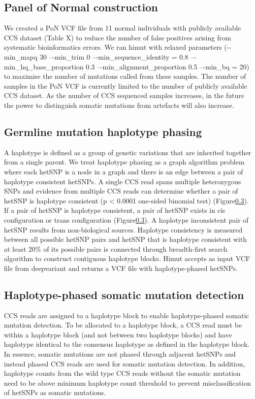 \subsection{Panel of Normal construction}

We created a PoN VCF file from 11 normal individuals with publicly available CCS dataset (Table X) to reduce the number of false positives arising from systematic bioinformatics errors. We ran himut with relaxed parameters (-{}-min\_mapq 30 –{}-min\_trim 0 –{}-min\_sequence\_identity = 0.8 –{}-min\_hq\_base\_proportion 0.3 –{}-min\_alignment\_proportion 0.5 –{}-min\_bq = 20) to maximise the number of mutations called from these samples. The number of samples in the PoN VCF is currently limited to the number of publicly available CCS dataset. As the number of CCS sequenced samples increases, in the future the power to distinguish somatic mutations from artefacts will also increase.  

\subsection{Germline mutation haplotype phasing}

A haplotype is defined as a group of genetic variations that are inherited together from a single parent. We treat haplotype phasing as a graph algorithm problem where each hetSNP is a node in a graph and there is an edge between a pair of haplotype consistent hetSNPs. A single CCS read spans multiple heterozygous SNPs and evidence from multiple CCS reads can determine whether a pair of hetSNP is haplotype consistent (p < 0.0001 one-sided binomial test) (Figure\ref{}). If a pair of hetSNP is haplotype consistent, a pair of hetSNP exists in cis configuration or trans configuration (Figure\ref{}). A haplotype inconsistent pair of hetSNP results from non-biological sources. Haplotype consistency is measured between all possible hetSNP pairs and hetSNP that is haplotype consistent with at least 20\% of its possible pairs is connected through breadth-first search algorithm to construct contiguous haplotype blocks. Himut accepts as input VCF file from deepvariant and returns a VCF file with haplotype-phased hetSNPs.

\subsection{Haplotype-phased somatic mutation detection}

CCS reads are assigned to a haplotype block to enable haplotype-phased somatic mutation detection. To be allocated to a haplotype block, a CCS read must be within a haplotype block (and not between two haplotype blocks) and have haplotype identical to the consensus haplotype as defined in the haplotype block. In essence, somatic mutations are not phased through adjacent hetSNPs and instead phased CCS reads are used for somatic mutation detection. In addition, haplotype counts from the wild type CCS reads without the somatic mutation need to be above minimum haplotype count threshold to prevent misclassification of hetSNPs as somatic mutations.
 

